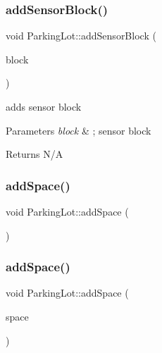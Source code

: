 \subsubsection{\texorpdfstring{add\+Sensor\+Block()}{addSensorBlock()}}
{\footnotesize\ttfamily void Parking\+Lot\+::add\+Sensor\+Block (\begin{DoxyParamCaption}\item[{\mbox{\hyperlink{class_sensor_block}{Sensor\+Block}}}]{block }\end{DoxyParamCaption})}



adds sensor block 


\begin{DoxyParams}{Parameters}
{\em block} & ; sensor block \\
\hline
\end{DoxyParams}
\begin{DoxyReturn}{Returns}
N/A 
\end{DoxyReturn}
\mbox{\label{class_parking_lot_a993a56b286a57424100cb90f815847a1}} 
\subsubsection{\texorpdfstring{add\+Space()}{addSpace()}\hspace{0.1cm}{\footnotesize\ttfamily [1/2]}}
{\footnotesize\ttfamily void Parking\+Lot\+::add\+Space (\begin{DoxyParamCaption}\item[{\mbox{\hyperlink{class_parking_space}{Parking\+Space}}}]{ }\end{DoxyParamCaption})}

\mbox{\label{class_parking_lot_a993a56b286a57424100cb90f815847a1}} 
\subsubsection{\texorpdfstring{add\+Space()}{addSpace()}\hspace{0.1cm}{\footnotesize\ttfamily [2/2]}}
{\footnotesize\ttfamily void Parking\+Lot\+::add\+Space (\begin{DoxyParamCaption}\item[{\mbox{\hyperlink{class_parking_space}{Parking\+Space}}}]{space }\end{DoxyParamCaption})}



